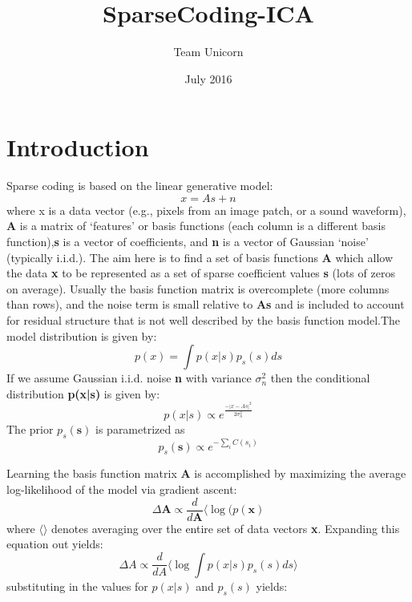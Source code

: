 \documentclass{article}
\title{SparseCoding-ICA}
\author{Team Unicorn}
\date{July 2016}
\begin{document}
\maketitle

\section{Introduction}
Sparse coding is based on the linear generative model:
\begin{equation}
    x = As + n
\end{equation}
where x is a data vector (e.g., pixels from an image patch, or a sound waveform), \textbf{A} is a matrix of ‘features’ or basis functions (each column is a different basis function),\textbf{s} is a vector of coefficients, and \textbf{n} is a vector of Gaussian ‘noise’ (typically i.i.d.). The aim here is to find a set of basis functions \textbf{A} which allow the data \textbf{x} to be represented as a set of sparse coefficient values \textbf{s} (lots of zeros on average). Usually the basis function matrix is overcomplete (more columns than rows), and the noise term is small relative to \textbf{As} and is included to account for residual structure that is not well described by the basis function model.The model distribution is given by:
\begin{equation}
    p(x) = \int{p(x|s)p_s(s) ds}
\end{equation}
If we assume Gaussian i.i.d. noise \textbf{n} with variance \textbf{$\sigma_n^2$} then the conditional distribution \textbf{p(x|s)} is given by:
\begin{equation}
    p(x|s) \propto e^{\frac{-|x - As|^2}{2\sigma_n^2}}
\end{equation}
The prior $p_s(\textbf{s})$ is parametrized as
\begin{equation}
    p_s(\textbf{s}) \propto e^{-\sum_i C(s_i)}
\end{equation}
\par Learning the basis function matrix \textbf{A} is accomplished by maximizing the average log-likelihood of the model via gradient ascent:
\begin{equation}
    \Delta\textbf{A} \propto \frac{d}{d\textbf{A}}\langle \log(p(\textbf{x})
\end{equation}
where $\langle\rangle$ denotes averaging over the entire set of data vectors \textbf{x}. Expanding this equation out yields:
\begin{equation}
    \Delta A \propto \frac{d}{dA} \langle \log\int p(x|s)p_s(s) ds \rangle
\end{equation}
substituting in the values for $p(x|s)$ and $p_s(s)$ yields:
\end{document}

